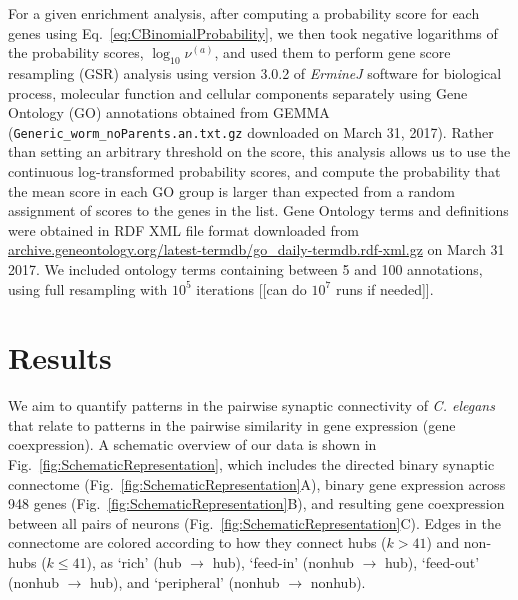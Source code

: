 \documentclass[10pt,letterpaper]{article}
\begin{document}
For a given enrichment analysis, after computing a probability score for each genes using Eq.~\eqref{eq:CBinomialProbability}, we then took negative logarithms of the probability scores, $\log_{10}\nu^{(a)}$, and used them to perform gene score resampling (GSR) analysis using version 3.0.2 of \emph{ErmineJ} software \cite{Gillis2010} for biological process, molecular function and cellular components separately using Gene Ontology (GO) annotations \cite{Ashburner2000} obtained from GEMMA \cite{Zoubarev2012} (\texttt{Generic\_worm\_noParents.an.txt.gz} downloaded on March 31, 2017).
Rather than setting an arbitrary threshold on the score, this analysis allows us to use the continuous log-transformed probability scores, and compute the probability that the mean score in each GO group is larger than expected from a random assignment of scores to the genes in the list.
Gene Ontology terms and definitions were obtained in RDF XML file format downloaded from \url{archive.geneontology.org/latest-termdb/go_daily-termdb.rdf-xml.gz} on March 31 2017.
We included ontology terms containing between 5 and 100 annotations, using full resampling with $10^{5}$ iterations [[can do $10^{7}$ runs if needed]].


\section*{Results}

We aim to quantify patterns in the pairwise synaptic connectivity of \emph{C. elegans} that relate to patterns in the pairwise similarity in gene expression (gene coexpression).
A schematic overview of our data is shown in Fig.~\ref{fig:SchematicRepresentation}, which includes the directed binary synaptic connectome (Fig.~\ref{fig:SchematicRepresentation}A), binary gene expression across 948 genes (Fig.~\ref{fig:SchematicRepresentation}B), and resulting gene coexpression between all pairs of neurons (Fig.~\ref{fig:SchematicRepresentation}C).
Edges in the connectome are colored according to how they connect hubs ($k > 41$) and non-hubs ($k \leq 41$), as `rich' (hub $\rightarrow$ hub), `feed-in' (nonhub $\rightarrow$ hub), `feed-out' (nonhub $\rightarrow$ hub), and `peripheral' (nonhub $\rightarrow$ nonhub).
\end{document}
